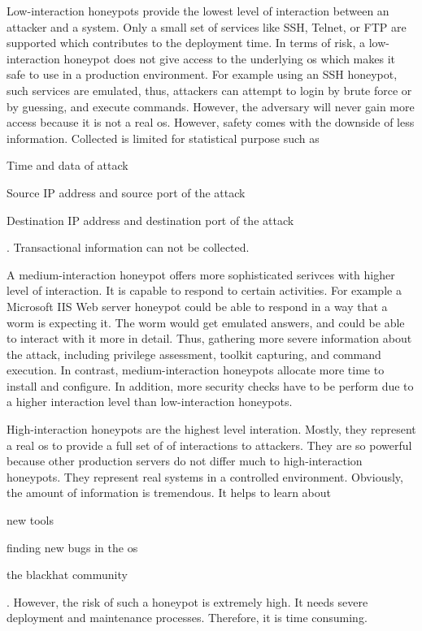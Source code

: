 Low-interaction honeypots provide the lowest level of interaction between an attacker and a system.
Only a small set of services like SSH, Telnet, or FTP are supported which contributes to the deployment time.
In terms of risk, a low-interaction honeypot does not give access to the underlying \ac{os} which makes it safe to use in a production environment.
For example using an SSH honeypot, such services are emulated, thus, attackers can attempt to login by brute force or by guessing, and execute commands.
However, the adversary will never gain more access because it is not a real \ac{os}.
However, safety comes with the downside of less information.
Collected is limited for statistical purpose such as
\begin{enumerate*}[label=(\roman*)]
    \item Time and data of attack
    \item Source IP address and source port of the attack
    \item Destination IP address and destination port of the attack
\end{enumerate*}.
Transactional information can not be collected. \cite{Spitzner2003}

A medium-interaction honeypot offers more sophisticated serivces with higher level of interaction.
It is capable to respond to certain activities.
For example a Microsoft IIS Web server honeypot could be able to respond in a way that a worm is expecting it.
The worm would get emulated answers, and could be able to interact with it more in detail.
Thus, gathering more severe information about the attack, including privilege assessment, toolkit capturing, and command execution.
In contrast, medium-interaction honeypots allocate more time to install and configure.
In addition, more security checks have to be perform due to a higher interaction level than low-interaction honeypots. \cite{Spitzner2003}

High-interaction honeypots are the highest level interation.
Mostly, they represent a real \ac{os} to provide a full set of of interactions to attackers.
They are so powerful because other production servers do not differ much to high-interaction honeypots.
They represent real systems in a controlled environment.
Obviously, the amount of information is tremendous. It helps to learn about
\begin{enumerate*}[label=(\roman*)]
    \item new tools
    \item finding new bugs in the \ac{os}
    \item the blackhat community
\end{enumerate*}. However, the risk of such a honeypot is extremely high.
It needs severe deployment and maintenance processes.
Therefore, it is time consuming.

